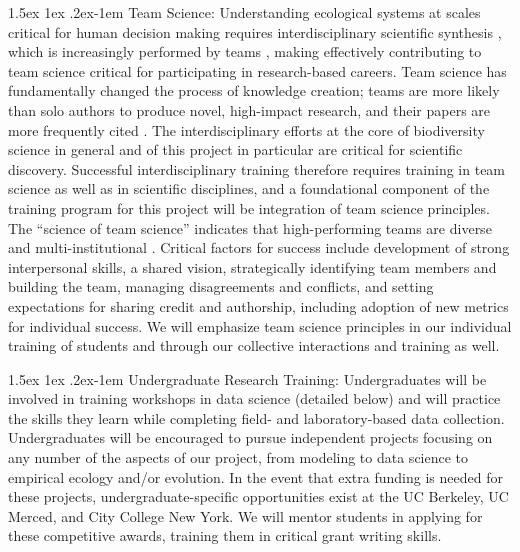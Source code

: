 \documentclass[11pt]{article}
\makeatletter
\renewcommand{\paragraph}{\@startsection{paragraph}{4}{\z@}
  {1.5ex \@plus 1ex \@minus .2ex}{-1em}
  {\normalfont\normalsize\it}
}
\makeatother
\begin{document}
\paragraph{Team Science:} Understanding ecological systems at scales
critical for human decision making requires interdisciplinary
scientific synthesis \citep{goring2014}, which is increasingly
performed by teams \citep{wuchty2007}, making effectively contributing
to team science critical for participating in research-based careers. Team
science has fundamentally changed the process of knowledge creation;
teams are more likely than solo authors to produce novel, high-impact
research, and their papers are more frequently cited
\citep{wuchty2007}. The interdisciplinary efforts at the core of
biodiversity science in general and of this project in particular are
critical for scientific discovery. Successful interdisciplinary
training therefore requires training in team science as well as in
scientific disciplines, and a foundational component of the training
program for this project will be integration of team science
principles.  The ``science of team science'' indicates that
high-performing teams are diverse \citep{cheruvelil2014} and
multi-institutional \citep{jones2008}. Critical factors for success
include development of strong interpersonal skills, a shared vision,
strategically identifying team members and building the team, managing
disagreements and conflicts, and setting expectations for sharing
credit and authorship\citep{goring2014, cheruvelil2014}, including
adoption of new metrics for individual success. We will emphasize team
science principles in our individual training of students
and through our collective interactions and training as well.

\paragraph{Undergraduate Research Training:} Undergraduates will be
involved in training workshops in data science (detailed below) and
will practice the skills they learn while completing field- and
laboratory-based data collection. Undergraduates will be encouraged to
pursue independent projects focusing on any number of the aspects of
our project, from modeling to data science to empirical ecology and/or
evolution. In the event that extra funding is needed for these
projects, undergraduate-specific opportunities exist at the UC
Berkeley, UC Merced, and City College New York. We will mentor
students in applying for these competitive awards, training them in
critical grant writing skills.
\end{document}
